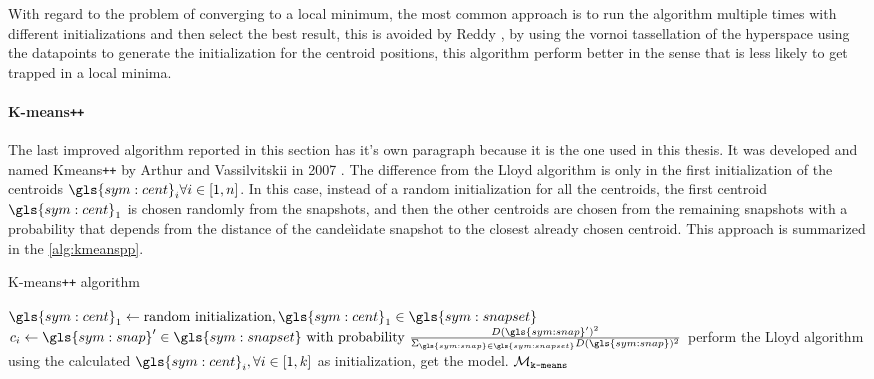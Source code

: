 With regard to the problem of converging to a local minimum, the most common approach is to run the algorithm multiple times with different initializations and then select the best result, this is avoided by Reddy \cite{Vornoi_Kmeans}, by using the vornoi tassellation of the hyperspace using the datapoints to generate the initialization for the centroid positions, this algorithm perform better in the sense that is less likely to get trapped in a local minima.


\paragraph{K-means\texttt{++}} 
The last improved algorithm reported in this section has it's own paragraph because it is the one used in this thesis. It was developed and named Kmeans\texttt{++} by Arthur and Vassilvitskii in 2007 \cite{Kmeanspp}. The difference from the Lloyd algorithm is only in the first initialization of the centroids $\gls{sym:cent}_i \forall i \in [1,n]$. In this case, instead of a random initialization for all the centroids, the first centroid $\gls{sym:cent}_1$ is chosen randomly from the snapshots, and then the other centroids are chosen from the remaining snapshots with a probability that depends from the distance of the candeìidate snapshot to the closest already chosen centroid. This approach is summarized in the \autoref{alg:kmeanspp}.

\begin{algorithm}
  \caption{K-means\texttt{++} algorithm}
  \label{alg:kmeanspp}
\begin{algorithmic}[1]
  \State $\gls{sym:cent}_1 \gets \text{random initialization}, \gls{sym:cent}_1 \in \gls{sym:snapset}$
  \State $c_i \gets \gls{sym:snap}' \in \gls{sym:snapset} \text{ with probability } \frac{D(\gls{sym:snap}')^2}{\Sigma_{\gls{sym:snap}\in\gls{sym:snapset}}D(\gls{sym:snap})^2}$
  \EndFor
  \State perform the Lloyd algorithm using the calculated $\gls{sym:cent}_i, \forall i \in [1,k]$ as initialization, get the model.
  \State \Return $\mathcal{M}_{\text{\texttt{k-means}}}$  
  \EndFunction
\end{algorithmic}
\end{algorithm}

